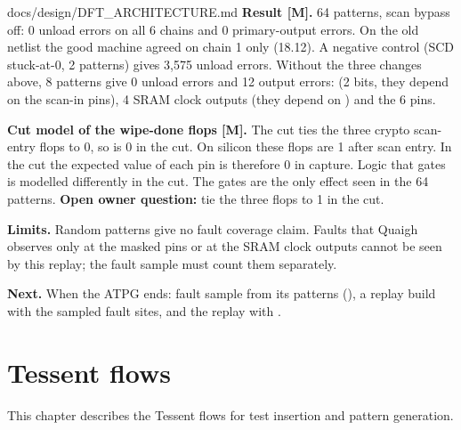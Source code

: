 \begin{relocated}{docs/design/DFT_ARCHITECTURE.md}
\textbf{Result {[}M{]}.} 64 patterns, scan bypass off: 0 unload errors
on all 6 chains and 0 primary-output errors. On the old netlist the good
machine agreed on chain 1 only (18.12). A negative control (SCD
stuck-at-0, 2 patterns) gives 3,575 unload errors. Without the three
changes above, 8 patterns give 0 unload errors and 12 output errors:
 (2 bits, they depend on the scan-in pins), 4 SRAM
clock outputs (they depend on ) and the 6
 pins.

\textbf{Cut model of the wipe-done flops {[}M{]}.} The cut ties the
three crypto scan-entry flops to 0, so  is 0 in
the cut. On silicon these flops are 1 after scan entry. In the cut the
expected value of each  pin is therefore 0 in capture.
Logic that  gates is modelled differently in the
cut. The  gates are the only effect seen in the 64
patterns. \textbf{Open owner question:} tie the three flops to 1 in the
cut.

\textbf{Limits.} Random patterns give no fault coverage claim. Faults
that Quaigh observes only at the masked  pins or at the
SRAM clock outputs cannot be seen by this replay; the fault sample must
count them separately.

\textbf{Next.} When the ATPG ends: fault sample from its patterns
(), a replay build with the sampled
fault sites, and the replay with .
\end{relocated}


\chapter{Tessent flows}\label{tm:ch:tessent-flows}

This chapter describes the Tessent flows for test insertion and pattern generation.


